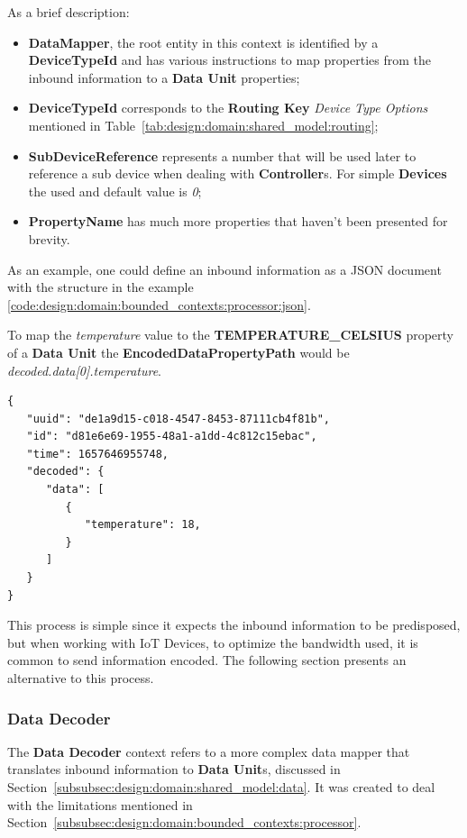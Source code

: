 As a brief description:

\begin{itemize}
   \item \textbf{DataMapper}, the root entity in this context is identified by a \textbf{DeviceTypeId} and has various instructions to map properties from the inbound information to a \textbf{Data Unit} properties;
   \item \textbf{DeviceTypeId} corresponds to the \textbf{Routing Key} \textit{Device Type Options} mentioned in Table~\ref{tab:design:domain:shared_model:routing};
   \item \textbf{SubDeviceReference} represents a number that will be used later to reference a sub device when dealing with \textbf{Controller}s. For simple \textbf{Devices} the used and default value is \textit{0}; 
   \item \textbf{PropertyName} has much more properties that haven't been presented for brevity.
\end{itemize}

As an example, one could define an inbound information as a JSON document with the structure in the example \ref{code:design:domain:bounded_contexts:processor:json}. 

To map the \textit{temperature} value to the \textbf{TEMPERATURE\_CELSIUS} property of a \textbf{Data Unit} the \textbf{EncodedDataPropertyPath} would be \textit{decoded.data[0].temperature}.

\begin{lstlisting}[caption=Inbound Information Example, label={code:design:domain:bounded_contexts:processor:json}]
{
   "uuid": "de1a9d15-c018-4547-8453-87111cb4f81b",
   "id": "d81e6e69-1955-48a1-a1dd-4c812c15ebac",
   "time": 1657646955748,
   "decoded": {
      "data": [
         {
            "temperature": 18,
         }
      ]
   }
}
\end{lstlisting}

This process is simple since it expects the inbound information to be predisposed, but when working with \gls{IoT} Devices, to optimize the bandwidth used, it is common to send information encoded. The following section presents an alternative to this process.   

\subsubsection*{Data Decoder}
\label{subsubsec:design:domain:bounded_contexts:decoder}

The \textbf{Data Decoder} context refers to a more complex data mapper that translates inbound information to \textbf{Data Unit}s, discussed in Section~\ref{subsubsec:design:domain:shared_model:data}.
It was created to deal with the limitations mentioned in Section~\ref{subsubsec:design:domain:bounded_contexts:processor}.

